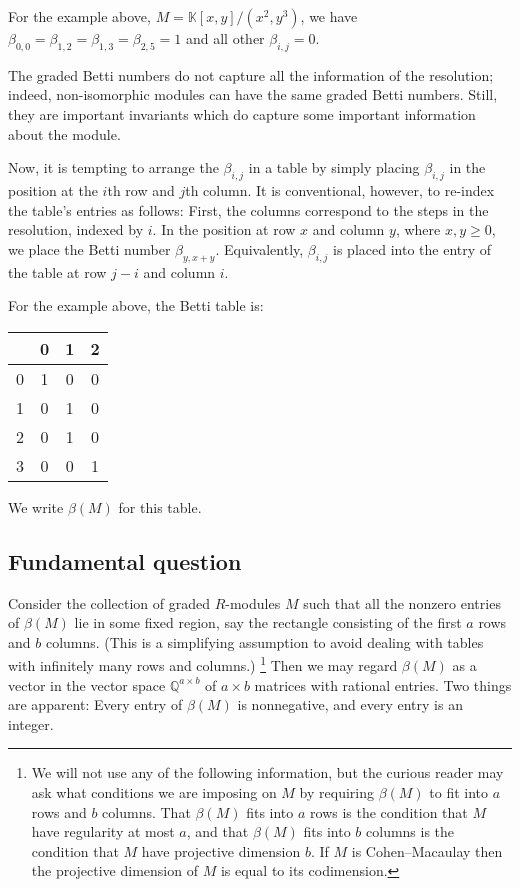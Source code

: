 \documentclass[12pt]{amsart}
\theoremstyle{plain}
\theoremstyle{definition}
\theoremstyle{remark}
\newcommand{\Q}{\mathbb{Q}}
\newcommand{\field}{\mathbb{K}}
\begin{document}
For the example above, $M = \field[x,y]/(x^2,y^3)$, we have
$\beta_{0,0} = \beta_{1,2} = \beta_{1,3} = \beta_{2,5} = 1$ and all other $\beta_{i,j} = 0$.

The graded Betti numbers do not capture all the information of the resolution;
indeed, non-isomorphic modules can have the same graded Betti numbers.
Still, they are important invariants which do capture some important information about the module.

Now, it is tempting to arrange the $\beta_{i,j}$ in a table by simply placing $\beta_{i,j}$
in the position at the $i$th row and $j$th column.
It is conventional, however, to re-index the table's entries as follows:
First, the columns correspond to the steps in the resolution, indexed by $i$.
In the position at row $x$ and column $y$, where $x,y \geq 0$, we place the Betti number $\beta_{y,x+y}$.
Equivalently, $\beta_{i,j}$ is placed into the entry of the table at row $j-i$ and column $i$.

For the example above, the Betti table is:

\begin{center}
\begin{tabular}{ c | c c c }
    & 0 & 1 & 2 \\
\hline
0 & 1 & 0 & 0 \\
1 & 0 & 1 & 0 \\
2 & 0 & 1 & 0 \\
3 & 0 & 0 & 1
\end{tabular}
\end{center}

We write $\beta(M)$ for this table.

\subsection{Fundamental question}
Consider the collection of graded $R$-modules $M$ such that all the nonzero entries
of $\beta(M)$ lie in some fixed region, say the rectangle consisting of the first $a$ rows and $b$ columns.
(This is a simplifying assumption to avoid dealing with tables with infinitely many rows and columns.)%
\footnote{We will not use any of the following information, but the curious reader may
ask what conditions we are imposing on $M$ by requiring $\beta(M)$ to fit into $a$ rows and $b$ columns.
That $\beta(M)$ fits into $a$ rows is the condition that $M$ have regularity at most $a$,
and that $\beta(M)$ fits into $b$ columns is the condition that $M$ have projective dimension $b$.
If $M$ is Cohen--Macaulay then the projective dimension of $M$ is equal to its codimension.}
Then we may regard $\beta(M)$ as a vector in the vector space $\Q^{a \times b}$
of $a\times b$ matrices with rational entries.
Two things are apparent: Every entry of $\beta(M)$ is nonnegative, and every entry is an integer.
\end{document}
